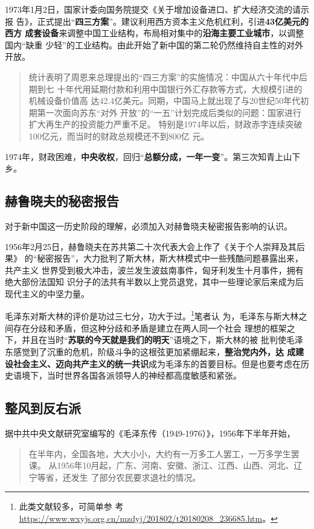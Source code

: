 1973年1月2日，国家计委向国务院提交《关于增加设备进口、扩大经济交流的请示报
告》，正式提出“\textbf{四三方案}”。建议利用西方资本主义危机红利，引进\textbf{43亿美元的西方
成套设备}来调整中国工业结构，布局相对集中的\textbf{沿海主要工业城市}，以调整国内“缺重
少轻”的工业结构。由此开始了新中国的第二轮仍然维持自主性的对外开放。
\begin{quotation}
  统计表明了周恩来总理提出的“四三方案”的实施情况：中国从六十年代中后期到七
  十年代用延期付款和利用中国银行外汇存款等方式，大规模引进的机械设备价值高
  达42.4亿美元。同期，中国马上就出现了与20世纪50年代初期第一次面向苏东“对外
  开放”的“一五”计划完成后类似的问题：国家进行扩大再生产的投资能力严重不足。
  特别是1974年以后，财政赤字连续突破100亿元，而当时的财政总规模还不到800亿
  元。\cite{wenbaci}
\end{quotation}
1974年，财政困难，\textbf{中央收权}，回归“\textbf{总额分成，一年一变}”。第三次知青上山下乡。

\subsection{赫鲁晓夫的秘密报告}

对于新中国这一历史阶段的理解，必须加入对赫鲁晓夫秘密报告影响的认识。

1956年2月25日，赫鲁晓夫在苏共第二十次代表大会上作了《关于个人崇拜及其后果》
的“秘密报告”，大力批判了斯大林，斯大林模式中一些残酷问题暴露出来，共产主义
世界受到极大冲击，波兰发生波兹南事件，匈牙利发生十月事件，拥有绝大部份法国知
识分子的法共有半数以上党员退党，其中一些理论家后来成为后现代主义的中坚力量。

毛泽东对斯大林的评价是功过三七分，功大于过。\footnote{此类文献较多，可简单参
  考\url{https://www.wxyjs.org.cn/mzdyj/201802/t20180208_236685.htm}。}笔者认
为，毛泽东与斯大林之间存在分歧和矛盾，但这种分歧和矛盾是建立在两人同一个社会
理想的框架之下，并且在当时“\textbf{苏联的今天就是我们的明天}”语境之下，斯大林的被
批判使毛泽东感觉到了沉重的危机，阶级斗争的这根弦更加紧绷起来，\textbf{整治党内外，达
成建设社会主义、迈向共产主义的统一共识}成为毛泽东的首要目标。但是也要考虑在历
史语境下，当时世界各国各派领导人的神经都高度敏感和紧张。

\subsection{整风到反右派}

据中共中央文献研究室编写的《毛泽东传（1949-1976）》，1956年下半年开始，
\begin{quotation}
  在半年内，全国各地，大大小小，大约有一万多工人罢工，一万多学生罢课。
  从1956年10月起，广东、河南、安徽、浙江、江西、山西、河北、辽宁等省，还发生
  了部分农民要求退社的情况。
\end{quotation}

